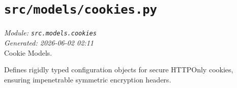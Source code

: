 
\section{\texttt{src/models/cookies.py}}
\textit{Module: \texttt{src.models.cookies}} \\
\textit{Generated: 2026-06-02 02:11} \\

Cookie Models.

Defines rigidly typed configuration objects for secure HTTPOnly cookies,
ensuring impenetrable symmetric encryption headers.

